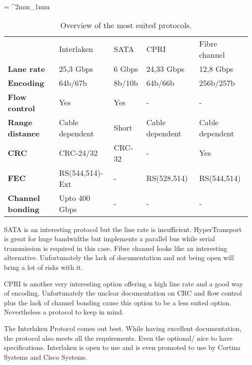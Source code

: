 	\tabulinesep = ^2mm_1mm
	\everyrow{\tabucline[.3mm  white]{}}
	
	\begin{table}[H]
		\begin{tabu} to 
			\tableHeaderStyle
							& Interlaken 	  & SATA 	& CPRI 			 & Fibre channel \\ 
			Lane rate		& 25,3 Gbps 	  & 6 Gbps 	& 24,33 Gbps 	 & 12,8 Gbps	  		\\ 
			Encoding 		& 64b/67b 		  & 8b/10b 	& 64b/66b		 & 256b/257b 	 	    \\
			Flow control 	& Yes 			  & Yes 	& - 			 & - 					\\
			Range distance 	& Cable dependent & Short	& Cable dependent& Cable dependent		\\
			CRC 			& CRC-24/32		  & CRC-32 	& - 			 & Yes 			   	    \\
			FEC 			& RS(544,514)-Ext & - 	 	& RS(528,514)  	 & RS(544,514) 			\\
			Channel bonding & Upto 400 Gbps   & - 	 	& -				 & - 					\\
		\end{tabu}
		\caption{Overview of the most suited protocols.}
		\label{Tab:Survey_Stardard_Overview}
	\end{table}

	SATA is an interesting protocol but the line rate is insufficient. HyperTransport is great for huge bandwidths but implements a parallel bus while serial transmission is required in this case. Fibre channel looks like an interesting alternative. Unfortunately the lack of documentation and not being open will bring a lot of risks with it.
	
	CPRI is another very interesting option offering a high line rate and a good way of encoding. Unfortunately the unclear documentation on CRC and flow control plus the lack of channel bonding cause this option to be a less suited option. Nevertheless a protocol to keep in mind.
	
	The Interlaken Protocol comes out best. While having excellent documentation, the protocol also meets all the requirements. Even the optional/ nice to have specifications. Interlaken is open to use and is even promoted to use by Cortina Systems and Cisco Systems.
	
\newpage
